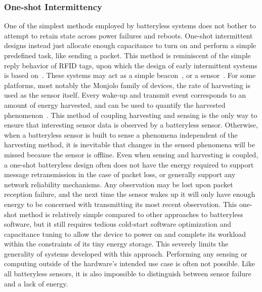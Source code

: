 \subsubsection{One-shot Intermittency}
\label{cha:background:one-shot}
One of the simplest methods employed by batteryless systems does not bother to attempt to retain state across power failures and reboots.
One-shot intermittent designs instead just allocate enough capacitance to turn on and perform a simple predefined task, like sending a packet.
This method is reminiscent of the simple reply behavior of RFID tags, upon which the design of early intermittent systems is based on~\cite{sample2008design}.
These systems may act as a simple beacon~\cite{campbell2016cinamin,saoda2019no}, or a sensor~\cite{yervaGrafting12, debruin2013monjolo, campbellEnergy14, campbellThermes14}.
For some platforms, most notably the Monjolo family of devices, the rate of harvesting is used as the sensor itself. Every wake-up and transmit event corresponds to an amount of energy harvested, and can be used to quantify the harvested phenomenon~\cite{campbellThermes14, campbellEnergy14, debruin2013monjolo}.
This method of coupling harvesting and sensing is the only way to ensure that interesting sensor data is observed by a batteryless sensor.
Otherwise, when a batteryless sensor is built to sense a phenomena independent of the harvesting method, it is inevitable that changes in the sensed phenomena will be missed because the sensor is offline.
Even when sensing and harvesting is coupled, a one-shot batteryless design often does not have the energy required to support message retransmission in the case of packet loss, or generally support any network reliability mechanisms.
Any observation may be lost upon packet reception failure, and the next time the sensor wakes up it will only have enough energy to be concerned with transmitting its most recent observation.
This one-shot method is relatively simple compared to other approaches to batteryless software, but it still requires tedious cold-start software optimization and capacitance tuning to allow the device to power on and complete its workload within the constraints of its tiny energy storage.
This severely limits the generality of systems developed with this approach.
Performing any sensing or computing outside of the hardware's intended use case is often not possible.
Like all batteryless sensors, it is also impossible to distinguish between sensor failure and a lack of energy.

\clearpage

